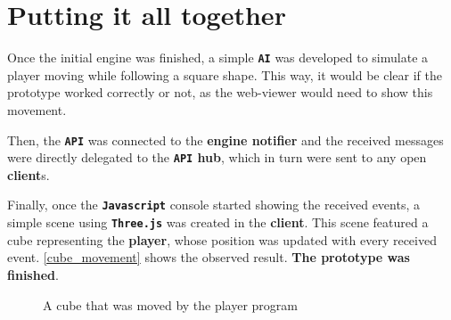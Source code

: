 \documentclass[a4paper,11pt,titlepage,abstract,numbers=noenddot,automark,mnsy,intlimits,rgb,dvipsnames]{report}
\begin{document}
\section{Putting it all together}
Once the initial engine was finished, a simple \textbf{\texttt{AI}} was developed to simulate a player moving
while following a square shape. This way, it would be clear if the prototype worked correctly or not, as the web-viewer would need
to show this movement.

Then, the \textbf{\texttt{API}} was connected to the \textbf{engine notifier} and the received messages were directly delegated to the \textbf{\texttt{API} hub},
which in turn were sent to any open \textbf{client}s.

Finally, once the \textbf{\texttt{Javascript}} console started showing the received events, a simple scene using \textbf{\texttt{Three.js}} was created in the
\textbf{client}. This scene featured a cube representing the \textbf{player}, whose position was updated with every received event.
\autoref{cube_movement} shows the observed result. \textbf{The prototype was finished}.
\begin{figure}[H]
\begin{center}
\noindent{}
\end{center}
\caption{A cube that was moved by the player program}
\label{cube_movement}
\end{figure}
\end{document}

